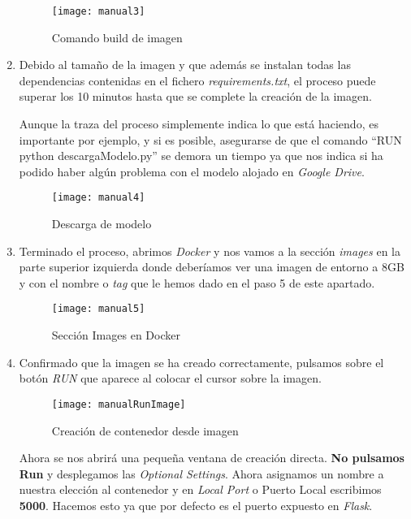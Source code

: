 \begin{enumerate}
    \begin{figure}[htb]
	\centering
	\texttt{[image: manual3]}
	\caption[Comando build de imagen]{Comando build de imagen}
    \end{figure}
    
    \item Debido al tamaño de la imagen y que además se instalan todas las dependencias contenidas en el fichero \emph{requirements.txt}, el proceso puede superar los 10 minutos hasta que se complete la creación de la imagen.
    
    Aunque la traza del proceso simplemente indica lo que está haciendo, es importante por ejemplo, y si es posible, asegurarse de que el comando ``RUN python descargaModelo.py'' se demora un tiempo ya que nos indica si ha podido haber algún problema con el modelo alojado en \emph{Google Drive}.
    
    \begin{figure}[htb]
	\centering
	\texttt{[image: manual4]}
	\caption[Descarga de modelo]{Descarga de modelo}
    \end{figure}
    
 
    \item Terminado el proceso, abrimos \emph{Docker} y nos vamos a la sección \emph{images} en la parte superior izquierda donde deberíamos ver una imagen de entorno a 8GB y con el nombre o \emph{tag} que le hemos dado en el paso 5 de este apartado.
    
    \begin{figure}[htb]
	\centering
	\texttt{[image: manual5]}
	\caption[Sección Images en Docker]{Sección Images en Docker}
    \end{figure}
    
    \item Confirmado que la imagen se ha creado correctamente, pulsamos sobre el botón \emph{RUN} que aparece al colocar el cursor sobre la imagen.
    
    \begin{figure}[htb]
	\centering
	\texttt{[image: manualRunImage]}
	\caption[Creación de contenedor desde imagen]{Creación de contenedor desde imagen}
    \end{figure}
    
    \clearpage
    
    Ahora se nos abrirá una pequeña ventana de creación directa. \textbf{No pulsamos Run} y desplegamos las \emph{Optional Settings}. Ahora asignamos un nombre a nuestra elección al contenedor y en \emph{Local Port} o Puerto Local escribimos \textbf{5000}. Hacemos esto ya que por defecto es el puerto expuesto en \emph{Flask}.
    

\end{enumerate}
